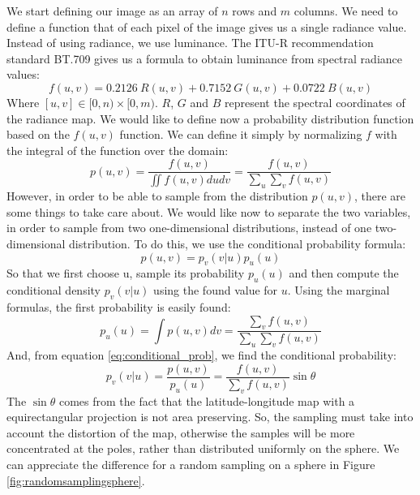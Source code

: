 We start defining our image as an array of $n$ rows and $m$ columns. We need to define a function that of each pixel of the image gives us a single radiance value. Instead of using radiance, we use luminance. The ITU-R recommendation standard BT.709 \citep{BT.709-2} gives us a formula to obtain luminance from spectral radiance values:
$$
f(u,v) = 0.2126\ R(u,v) + 0.7152\ G(u,v) + 0.0722\ B(u,v)
$$
Where $[u,v] \in [0,n)\times [0,m)$. $R$, $G$ and $B$ represent the spectral coordinates of the radiance map. We would like to define now a probability distribution function based on the $f(u,v)$ function. We can define it simply by normalizing $f$ with the integral of the function over the domain:
$$
p(u,v) = \frac{f(u,v)}{ \displaystyle\iint f(u,v) du dv} = \frac{f(u,v)}{ \displaystyle\sum_u \sum_v f(u,v)}
$$
However, in order to be able to sample from the distribution $p(u,v)$, there are some things to take care about. We would like now to separate the two variables, in order to sample from two one-dimensional distributions, instead of one two-dimensional distribution. To do this, we use the conditional probability formula:
\begin{equation}
p(u,v) = p_v(v|u) p_u(u)
\label{eq:conditional_prob}
\end{equation}
So that we first choose u, sample its probability $p_u(u)$ and then compute the conditional density $p_v(v|u)$ using the found value for $u$. Using the marginal formulas, the first probability is easily found:
$$
p_u(u) =\int p(u,v) dv = \frac{ \displaystyle\sum_v f(u,v)}{ \displaystyle\sum_u \sum_v f(u,v)}
$$
And, from equation \ref{eq:conditional_prob}, we find the conditional probability:
$$
p_v(v|u) = \frac{p(u,v)}{p_u(u)} = \frac{f(u,v)}{ \displaystyle\sum_v f(u,v)} \sin \theta
$$
The $\sin \theta$ comes from the fact that the latitude-longitude map with a equirectangular projection is not area preserving. So, the sampling must take into account the distortion of the map, otherwise the samples will be more concentrated at the poles, rather than distributed uniformly on the sphere. We can appreciate the difference for a random sampling on a sphere in Figure \ref{fig:randomsamplingsphere}.
